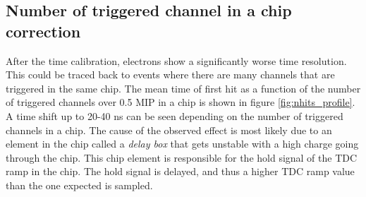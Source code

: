 \documentclass{JINST}
\begin{document}
\subsection{Number of triggered channel in a chip correction}
\label{sec:NumberTrigger}

After the time calibration, electrons show a significantly worse time resolution. This could be traced back to events where there are many channels that are triggered in the same chip. The mean time of first hit as a function of the number of triggered channels over 0.5 MIP in a chip is shown in figure \ref{fig:nhits_profile}. A time shift up to 20-40 ns can be seen depending on the number of triggered channels in a chip. The cause of the observed effect is most likely due to an element in the chip called a \textit{delay box} that gets unstable with a high charge going through the chip. This chip element is responsible for the hold signal of the TDC ramp in the chip. The hold signal is delayed, and thus a higher TDC ramp value than the one expected is sampled.
\end{document}

